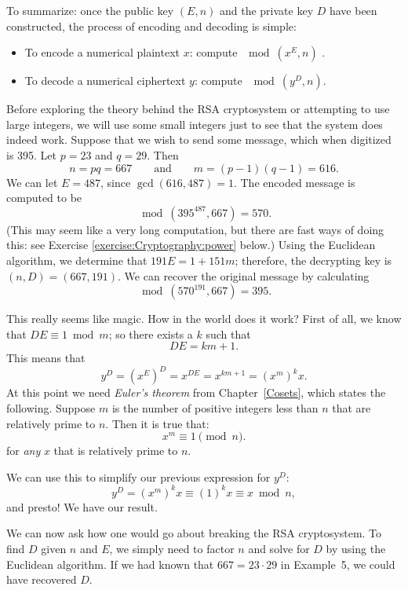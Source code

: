 To summarize: once the public key $(E,n)$ and the private key $D$ have been constructed, the process of encoding and decoding is simple:
\begin{itemize}
\item
To encode a numerical plaintext $x$:  compute $\mod (x^E,n)$ .
\item
To decode a numerical ciphertext $y$: compute $\mod(y^D,n)$.
\end{itemize}
 
\vspace{2 ex}
 
\begin{example}{}
Before exploring the theory behind the RSA cryptosystem or attempting
to use large integers, we will use some small integers just to see
that the system does indeed work. Suppose that we wish to send some
message, which when digitized is 395. Let $p = 23$ and $q = 29$.  Then 
$$ n = pq = 667 \qquad \textrm{and} \qquad
m = (p - 1)(q - 1) = 616.
$$
We can let $E = 487$, since $\gcd(616, 487) = 1$. The encoded message
is computed to be  
$$
\bmod(395^{487},  667) = 570.
$$
(This may seem like a very long computation, but there are fast ways of doing this: see Exercise \ref{exercise:Cryptography:power} below.)
Using the Euclidean
algorithm, we determine that $191 E = 1 + 151 m$; therefore, the
decrypting key is $(n, D) = ( 667, 191)$. We can recover the original 
message by calculating  
$$
 \bmod(570^{191}, 667) = 395.
$$
\end{example}
 
 
\vspace{ 2 ex}
 
 
This really seems like magic. How in the world does it work? 
First of all, we know that $DE
\equiv 1 \bmod{ m}$; so there exists a $k$ such that 
$$
DE = km + 1.
$$
This means that
$$
y^D = (x^E)^D = x^{DE} = x^{km+1} = (x^m)^k x.
$$
At this point we need \emph{Euler's theorem} from Chapter~\ref{Cosets}, which states the following. Suppose $m$ is the number of positive integers less than $n$ that are relatively prime to $n$. Then it is true that:
$$
x^m \equiv 1 \pmod n.
$$
for \emph{any} $x$ that is relatively prime to $n$. 

We can use this to simplify our previous expression for $y^D$:
$$
y^D =  (x^m)^k x \equiv (1)^k x  \equiv x \bmod n,
$$
 and presto! We have our result.
 
We can now ask how one would go about breaking the RSA cryptosystem.
To find $D$ given $n$ and $E$, we simply need to factor $n$ and solve
for $D$ by using the Euclidean algorithm. If we had known that $667 =
23 \cdot 29$ in Example~5, we could have recovered $D$.    
 
